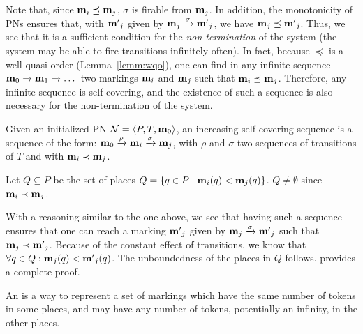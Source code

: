 Note that, since $\mathbf{m}_i \preceq \mathbf{m}_j$, $\sigma$ is firable from $\mathbf{m}_j$.
In addition, the monotonicity of \acp{PN} ensures that, with $\mathbf{m'}_j$ given by $\mathbf{m}_j \xrightarrow{\sigma} \mathbf{m'}_j$, we have $\mathbf{m}_j \preceq \mathbf{m'}_j$.
Thus, we see that it is a sufficient condition for the \emph{non-termination} of the system (the system may be able to fire transitions infinitely often).
In fact, because $\preceq$ is a well quasi-order (Lemma~\ref{lemm:wqo}), one can find in any infinite sequence $\mathbf{m}_0 \xrightarrow{} \mathbf{m}_1 \xrightarrow{} \dots$ two markings $\mathbf{m}_i$ and $\mathbf{m}_j$ such that $\mathbf{m}_i \preceq \mathbf{m}_j$. 
Therefore, any infinite sequence is self-covering, and the existence of such a sequence is also necessary for the non-termination of the system.

\begin{defi}
  Given an initialized \ac{PN} $\mathcal{N} = \langle P,T, \mathbf{m}_0\rangle$,
  an increasing self-covering sequence is a sequence of the form:
  \(
    \mathbf{m}_0 \xrightarrow{\rho} \mathbf{m}_i \xrightarrow{\sigma} \mathbf{m}_j
  \),
  with $\rho$ and $\sigma$ two sequences of transitions of $T$
  and with $\mathbf{m}_i \prec \mathbf{m}_j$.
\end{defi}

Let $Q \subseteq P$ be the set of places $Q = \{q \in P \mid \mathbf{m}_i(q) < \mathbf{m}_j(q)\}$.
$Q \neq \emptyset$ since $\mathbf{m}_i \prec \mathbf{m}_j$.

With a reasoning similar to the one above, we see that having such a sequence ensures that one can reach a marking $\mathbf{m'}_j$ given by $\mathbf{m}_j \xrightarrow{\sigma} \mathbf{m'}_j$ such that $\mathbf{m}_j \prec \mathbf{m'}_j$.
Because of the constant effect of transitions, we know that $\forall q \in Q : \mathbf{m}_j(q) < \mathbf{m'}_j(q)$.
The unboundedness of the places in $Q$ follows.
\cite{David17} provides a complete proof.

An \omark is a way to represent a set of markings which have the same number of tokens in some places, and may have any number of tokens, potentially an infinity, in the other places.

